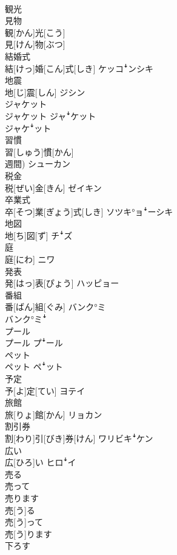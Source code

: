 \documentclass[8pt]{extreport}
\begin{document}
\begin{CJK}{UTF8}{min}
\\	観光 
\\	見物	
\\	観[かん]光[こう] 
\\	見[けん]物[ぶつ]	
\\	結婚式	
\\	結[けっ]婚[こん]式[しき]	ケッコꜜンシキ
\\	地震	
\\	地[じ]震[しん]	ジシン
\\	ジャケット	
\\	ジャケット	ジャꜜケット 
\\	ジャケꜜット
\\	習慣	
\\	習[しゅう]慣[かん] 
\\	週間)	シューカン
\\	税金	
\\	税[ぜい]金[きん]	ゼイキン
\\	卒業式	
\\	卒[そつ]業[ぎょう]式[しき]	ソツキ°ョꜜーシキ
\\	地図	
\\	地[ち]図[ず]	チꜜズ
\\	庭	
\\	庭[にわ]	ニワ
\\	発表	
\\	発[はっ]表[ぴょう]	ハッピョー
\\	番組	
\\	番[ばん]組[ぐみ]	バンク°ミ 
\\	バンク°ミꜜ
\\	プール	
\\	プール	プꜜール
\\	ペット	
\\	ペット	ペꜜット
\\	予定	
\\	予[よ]定[てい]	ヨテイ
\\	旅館	
\\	旅[りょ]館[かん]	リョカン
\\	割引券	
\\	割[わり]引[びき]券[けん]	ワリビキꜜケン
\\	広い	
\\	広[ひろ]い	ヒロꜜイ
\\	売る 
\\	売って 
\\	売ります	
\\	売[う]る 
\\	売[う]って 
\\	売[う]ります	
\\	下ろす 

\end{CJK}
\end{document}
